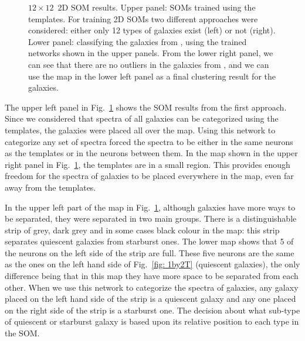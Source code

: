 \begin{figure}
\begin{subfigure}[b]{0.45\textwidth}
        \end{subfigure}
        \caption[$12\times12$ two-dimensional self-organizing map results]{$12\times12$~2D SOM results. Upper panel: SOMs trained using the \citet{Kinney96} templates. For training 2D SOMs two different approaches were considered: either only 12 types of galaxies exist (left) or not (right). Lower panel: classifying the galaxies from , using the trained networks shown in the upper panels. From the lower right panel, we can see that there are no outliers in the galaxies from , and we can use the map in the lower left panel as a final clustering result for the  galaxies.}
        \label{fig: 12by12}
    \end{figure}
    
    The upper left panel in Fig.~\ref{fig: 12by12} shows the SOM results from the first approach. 
    Since we considered that spectra of all galaxies can be categorized using the  templates, the galaxies were placed all over the map.
    Using this network to categorize any set of spectra forced the spectra to be either in the same neurons as the  templates or in the neurons between them.
    In the map shown in the upper right panel in Fig.~\ref{fig: 12by12}, the  templates are in a small region. This provides enough freedom for the spectra of galaxies to be placed everywhere in the map, even far away from the templates.
    
    
    In the upper left part of the map in Fig.~\ref{fig: 12by12}, although galaxies have more ways to be separated, they were separated in two main groups.
    There is a distinguishable strip of grey, dark grey and in some cases black colour in the map:
    this strip separates quiescent galaxies from starburst ones.
    The lower map shows that 5 of the neurons on the left side of the strip are full. 
    These five neurons are the same as the ones on the left hand side of Fig.~\ref{fig: 1by2T} (quiescent galaxies),
    the only difference being that in this map they have more space to be separated from each other.
    When we use this network to categorize the spectra of galaxies, any galaxy placed on the left hand side of the strip is a quiescent galaxy and any one placed on the right side of the strip is a starburst one.
    The decision about what sub-type of quiescent or starburst galaxy is based upon its relative position to each type in the SOM.
    
